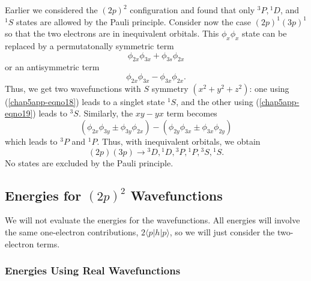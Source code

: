 Earlier we considered the $(2p)^2$ configuration and found that only
${^3P} , {^1D}$, and ${^1S}$ states are allowed by the Pauli
principle.  Consider now the case $(2p)^1(3p)^1$ so that the two
electrons are in inequivalent orbitals.  This $\phi_x \phi_x$ state
can be replaced by a permutatonally symmetric term
\begin{equation}
\phi_{2x} \phi_{3x}  + \phi_{3s} \phi_{2x}
\label{chap5app-eqno18}
\end{equation}
or an antisymmetric term
\begin{equation}
\phi_{2x} \phi_{3x} - \phi_{3x} \phi_{2x} .
\label{chap5app-eqno19}
\end{equation}
Thus, we get two wavefunctions with $S$ symmetry $(x^2 + y^2 + 
z^2)$: one using (\ref{chap5app-eqno18}) leads to a singlet state
${^1S}$, and the  
other using (\ref{chap5app-eqno19}) leads to ${^3S}$.  Similarly, the
$xy - yx$ term becomes
\begin{equation}
\left( \phi_{2x} \phi_{3y} \pm \phi_{3y} \phi_{2x} \right) - \left( 
\phi_{2y} \phi_{3x} \pm \phi_{3x} \phi_{2y} \right)
\end{equation}
which leads to ${^3P}$ and ${^1P}$.  Thus, with inequivalent orbitals, 
we obtain 
\begin{equation}
(2p)(3p) \rightarrow {^3D} , {^1D}, {^3P} , {^1P} , {^3S}, {^1S}.
\end{equation}
No states are excluded by the Pauli principle.

\subsection{Energies for $(2p)^2$ Wavefunctions}

We will not evaluate the energies for the wavefunctions.  All 
energies will involve the same one-electron contributions, $2 \langle 
p | h | p \rangle$, so we will just consider the two-electron terms.

\subsubsection{Energies Using Real Wavefunctions}

